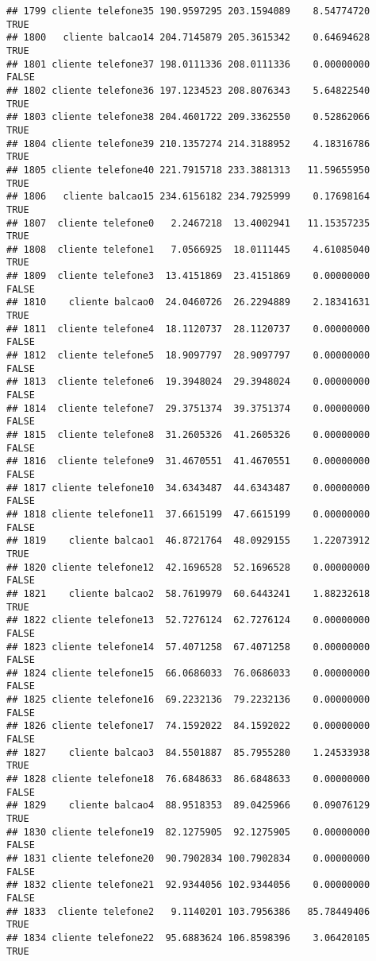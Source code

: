 \documentclass[
]{article}
\begin{document}
\begin{verbatim}
## 1799 cliente telefone35 190.9597295 203.1594089    8.54774720     TRUE
## 1800   cliente balcao14 204.7145879 205.3615342    0.64694628     TRUE
## 1801 cliente telefone37 198.0111336 208.0111336    0.00000000    FALSE
## 1802 cliente telefone36 197.1234523 208.8076343    5.64822540     TRUE
## 1803 cliente telefone38 204.4601722 209.3362550    0.52862066     TRUE
## 1804 cliente telefone39 210.1357274 214.3188952    4.18316786     TRUE
## 1805 cliente telefone40 221.7915718 233.3881313   11.59655950     TRUE
## 1806   cliente balcao15 234.6156182 234.7925999    0.17698164     TRUE
## 1807  cliente telefone0   2.2467218  13.4002941   11.15357235     TRUE
## 1808  cliente telefone1   7.0566925  18.0111445    4.61085040     TRUE
## 1809  cliente telefone3  13.4151869  23.4151869    0.00000000    FALSE
## 1810    cliente balcao0  24.0460726  26.2294889    2.18341631     TRUE
## 1811  cliente telefone4  18.1120737  28.1120737    0.00000000    FALSE
## 1812  cliente telefone5  18.9097797  28.9097797    0.00000000    FALSE
## 1813  cliente telefone6  19.3948024  29.3948024    0.00000000    FALSE
## 1814  cliente telefone7  29.3751374  39.3751374    0.00000000    FALSE
## 1815  cliente telefone8  31.2605326  41.2605326    0.00000000    FALSE
## 1816  cliente telefone9  31.4670551  41.4670551    0.00000000    FALSE
## 1817 cliente telefone10  34.6343487  44.6343487    0.00000000    FALSE
## 1818 cliente telefone11  37.6615199  47.6615199    0.00000000    FALSE
## 1819    cliente balcao1  46.8721764  48.0929155    1.22073912     TRUE
## 1820 cliente telefone12  42.1696528  52.1696528    0.00000000    FALSE
## 1821    cliente balcao2  58.7619979  60.6443241    1.88232618     TRUE
## 1822 cliente telefone13  52.7276124  62.7276124    0.00000000    FALSE
## 1823 cliente telefone14  57.4071258  67.4071258    0.00000000    FALSE
## 1824 cliente telefone15  66.0686033  76.0686033    0.00000000    FALSE
## 1825 cliente telefone16  69.2232136  79.2232136    0.00000000    FALSE
## 1826 cliente telefone17  74.1592022  84.1592022    0.00000000    FALSE
## 1827    cliente balcao3  84.5501887  85.7955280    1.24533938     TRUE
## 1828 cliente telefone18  76.6848633  86.6848633    0.00000000    FALSE
## 1829    cliente balcao4  88.9518353  89.0425966    0.09076129     TRUE
## 1830 cliente telefone19  82.1275905  92.1275905    0.00000000    FALSE
## 1831 cliente telefone20  90.7902834 100.7902834    0.00000000    FALSE
## 1832 cliente telefone21  92.9344056 102.9344056    0.00000000    FALSE
## 1833  cliente telefone2   9.1140201 103.7956386   85.78449406     TRUE
## 1834 cliente telefone22  95.6883624 106.8598396    3.06420105     TRUE

\end{verbatim}
\end{document}
